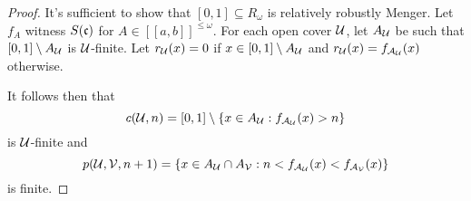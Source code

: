 \documentclass{amsart}
\theoremstyle{definition}
\begin{document}
\begin{proof}
  It's sufficient to show that \([0,1]\subseteq R_\omega\) is relatively
  robustly Menger. Let \(f_A\) witness \(S(\mathfrak{c})\)
  for \(A\in[[a,b]]^{\leq\omega}\).
  For each open cover \(\mathcal{U}\), let \(A_{\mathcal{U}}\) be
  such that \([0,1]\setminus A_{\mathcal{U}}\) is \(\mathcal{U}\)-finite.
  Let \(r_{\mathcal{U}}(x)=0\) if \(x\in[0,1]\setminus A_{\mathcal{U}}\) and
  \(r_{\mathcal{U}}(x)=f_{\mathcal{A}_{\mathcal{U}}}(x)\) otherwise.

  It follows then that
    \[
      c(\mathcal{U},n) = [0,1]\setminus\{x\in A_{\mathcal{U}}:f_{\mathcal{A}_{\mathcal{U}}}(x)>n\}
    \]
  is \(\mathcal{U}\)-finite and
    \[
      p(\mathcal{U},\mathcal{V},n+1)
        =
      \{x\in A_{\mathcal{U}}\cap A_{\mathcal{V}}
        :
      n<f_{\mathcal{A}_{\mathcal{U}}}(x)<f_{\mathcal{A}_{\mathcal{V}}}(x)\}
    \]
  is finite.
\end{proof}



\end{document}
